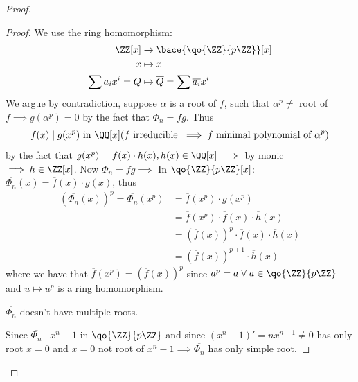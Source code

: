 \begin{proposition}
\begin{enumerate}
\begin{proof}
			      \begin{proof}
				      We use the ring homomorphism:
				      \[
					      \begin{aligned}
						      \ZZ[x]           & \to \bace{\qo{\ZZ}{p\ZZ}}[x]                   \\
						      x                & \mapsto x                                      \\
						      \sum a_i x^i = Q & \mapsto \overline{Q} = \sum \overline{a_i} x^i
					      \end{aligned}
				      \]
				      We argue by contradiction, suppose \( \alpha \) is a root of \( f \), such that \(
				      \alpha^p  \ne \) root of \( f  \implies  g(\alpha^p) = 0\) by the fact that \( \Phi_n
				      = fg\). Thus
				      \[
					      f(x) \mid g(x^p) \text{ in } \QQ[x] (f \text{ irreducible } \implies f \text{
						      minimal polynomial of } \alpha^p)
				      \]
				      by the fact that \( g(x^p) = f(x) \cdot h(x), h(x) \in \QQ[x] \implies \) by monic \(
				      \implies h \in \ZZ[x] \). Now \( \Phi_n = fg \implies \) In \( \qo{\ZZ}{p\ZZ}[x] \):
				      \( \overline{\Phi_n}(x) = \overline{f}(x) \cdot \overline{g}(x) \), thus
				      \[
					      \begin{aligned}
						      (\overline{\Phi_n}(x))^p = \overline{\Phi_n}(x^p) & = \overline{f} (x^p) \cdot
						      \overline{g}(x^p)                                                                   \\
						                                                        & = \overline{f}(x^p) \cdot
						      \overline{f} (x) \cdot
						      \overline{h} (x)                                                                    \\
						                                                        & = (\overline{f}(x))^p \cdot
						      \overline{f}(x) \cdot
						      \overline{h}(x)                                                                     \\
						                                                        & = (\overline{f}(x))^{p+1} \cdot
						      \overline{h}(x)
					      \end{aligned}
				      \]
				      where we have that \( \overline{f} (x^p) = (\overline{f}(x))^p \) since \( a^p = a \;
				      \forall \; a \in \qo{\ZZ}{p\ZZ}\) and \( u \mapsto u^p \) is a ring homomorphism.
				      \begin{note}
					      \( \overline{\Phi_n} \) doesn't have multiple roots.
				      \end{note}
				      Since \( \overline{\Phi_n} \mid x^n - 1 \) in \( \qo{\ZZ}{p\ZZ} \) and since \( (x^n -
				      1)' = nx^{n-1} \ne 0 \) has only root \( x = 0 \) and \( x = 0 \) not root of \( x^n -
				      1 \implies \overline{\Phi_n}\) has only simple root.


\end{proof}
\end{proof}
\end{enumerate}
\end{proposition}
